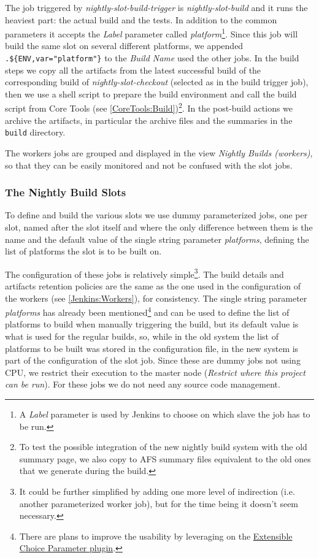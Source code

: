 \documentclass{lhcbnote}
\newcommand{\link}[2]{\href{#1}{#2}}
\begin{document}
The job triggered by \emph{nightly-slot-build-trigger} is
\emph{nightly-slot-build} and it runs the heaviest part: the actual build and
the tests.  In addition to the common parameters it accepts the \emph{Label}
parameter called \emph{platform}\footnote{A \emph{Label} parameter is used by
Jenkins to choose on which slave the job has to be run.}.  Since this job will
build the same slot on several different platforms, we appended
\verb|.${ENV,var="platform"}| to the \emph{Build Name} used the other jobs.  In
the build steps we copy all the artifacts from the latest successful build of
the corresponding build of \emph{nightly-slot-checkout} (selected as in the
build trigger job), then we use a shell script to prepare the build environment
and call the build script from Core Tools (see
\ref{CoreTools:Build})\footnote{To test the possible integration of the new
nightly build system with the old summary page, we also copy to AFS summary
files equivalent to the old ones that we generate during the build.}.  In the
post-build actions we archive the artifacts, in particular the archive files and
the summaries in the \texttt{build} directory.

The workers jobs are grouped and displayed in the view \emph{Nightly Builds (workers)}, so that they can be easily monitored and not be confused with the slot jobs.

\subsubsection{The Nightly Build Slots}
\label{Jenkins:Slots}
To define and build the various slots we use dummy parameterized jobs, one per slot, named after the slot itself and where the only difference between them is the name and the default value of the single string parameter \emph{platforms}, defining the list of platforms the slot is to be built on.

The configuration of these jobs is relatively simple\footnote{It could be further simplified by adding one more level of indirection (i.e. another parameterized worker job), but for the time being it doesn't seem necessary.}.  The build details and artifacts retention policies are the same as the one used in the configuration of the workers (see \ref{Jenkins:Workers}), for consistency.  The single string parameter \emph{platforms} has already been mentioned\footnote{There are plans to improve the usability by leveraging on the \link{https://wiki.jenkins-ci.org/display/JENKINS/Extensible+Choice+Parameter+plugin}{Extensible Choice Parameter plugin}.} and can be used to define the list of platforms to build when manually triggering the build, but its default value is what is used for the regular builds, so, while in the old system the list of platforms to be built was stored in the configuration file, in the new system is part of the configuration of the slot job.  Since these are dummy jobs not using CPU, we restrict their execution to the master node (\emph{Restrict where this project can be run}).  For these jobs we do not need any source code management.
\end{document}
